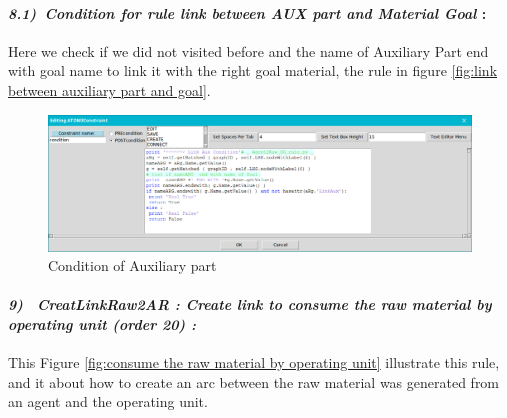 \paragraph{\emph{8.1)~Condition for rule link between AUX part and Material Goal } : }
Here we check if we did not visited before and the name of Auxiliary Part end with goal name to link it with the right goal material, the rule in figure \ref{fig:link between auxiliary part and goal}.
 
\vspace{1cm}
 
\begin{figure}[th]
	\centering
 	\includegraphics[scale=0.37]{ch3/img/condaux}
	\caption{\label{fig:Condition of Auxiliary part}Condition of Auxiliary part }
\end{figure} 


\paragraph{\emph{9)~ CreatLinkRaw2AR : Create link to consume the raw material by operating unit (order 20) :} }
 
 
This Figure \ref{fig:consume the raw material by operating unit} illustrate this rule, and it about how to create an arc between 
the raw material was generated from an agent and the operating unit.

